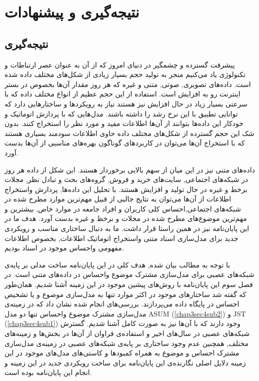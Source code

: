 \chapter{نتیجه‌گیری و پیشنهادات}
\thispagestyle{empty}
\section{نتیجه‌گیری}
پیشرفت گسترده و چشمگیر در دنیای امروز که از آن به عنوان عصر ارتباطات و تکنولوژی یاد می‌کنیم منجر به تولید حجم بسيار زیادی از شکل‌های مختلف داده شده است. داده‌های تصویری, صوتی, متنی و غیره که هر روز مقدار آن‌ها بخصوص در بستر اینترنت رو به افزایش است. استفاده از این حجم عظیم از انواع مختلف داده که با سرعتی بسيار زیاد در حال افزایش نیز هستند نیاز به رویکردها و ساختارهایی دارد که توانایی تطبیق با این نرخ رشد را داشته باشند. مدل‌هایی که با پردازش اتوماتیک و خودکار این داده‌ها بتوانند از آن‌ها اطلاعات مفید و مورد نظر را استخراج کنند. بدون شک این حجم گسترده از شکل‌های مختلف داده حاوی اطلاعات سودمند بسياری هستند که با استخراج آن‌ها می‌توان در کاربردهای گوناگون بهره‌های مناسبی از آن‌ها بدست آورد. 

داده‌های متنی نیز در این میان از سهم بالایی برخوردار هستند. این شکل از داده هر روز در شبکه‌های اجتماعی, سایت‌های خرید و فروش, گروه‌های بحث و تبادل نظر, مجلات برخط و غیره در حال تولید و افزایش هستند. با تحلیل این داده‌ها, پردازش واستخراج اطلاعات از آن‌ها می‌توان به نتایج جالبی از قبیل مهم‌ترین موارد مطرح شده در شبکه‌های اجتماعی,احساس کلی کاربران و افراد جامعه در موارد خاص, بیشترین و مهم‌ترین موضوع‌های مطرح شده در مجلات و برخظ و غیره بدست آورد. هدف ما در این پایان‌‌نامه نیز در همین راستا قرار داشت. ما به دنبال ساختاری مناسب و رویکردی جدید برای مدل‌سازی اسناد متنی واستخراج اتوماتیک اطلاعات, بخصوص اطلاعات مفهومی واحساس موجود در اسناد بودیم.

با توجه به مطالب بیان شده, هدف کلی در این پایان‌‌نامه ساخت مدلی بر پایه‌ی شبکه‌های عصبی برای مدل‌سازی مشترک موضوع واحساس در داده‌های متنی است. در فصل سوم این پایان‌‌نامه با روش‌های پیشین موجود در این زمینه آشنا شدیم. همان‌طور که گفته شد ساختارهای موجود در اکثر موارد تنها به مدل‌سازی موضوع و یا تشخیص احساس در پایگاه داده می‌پردازند. بررسی‌های انجام شده نشان داد که در زمینه‌ی مدل‌سازی مشترک موضوع واحساس تنها دو مدل
ASUM (\ref{chap3sec4sub2})
و 
JST (\ref{chap3sec4sub1})
وجود دارند که با آن‌ها نیز به صورت کامل آشنا شدیم. گسترش شبکه‌های عصبی در سال‌های اخیر و استفاده‌ی فراوان از آن‌ها در بخش‌ها و زمینه‌های مختلف, همچنین عدم وجود ساختاری بر پایه‌ی شبکه‌های عصبی در زمینه‌ی مدل‌سازی مشترک احساس و موضوع به همراه کمبودها و کاستی‌های مدل‌های موجود در این زمینه دلایل اصلی نگارند‌ه‌ی این پایان‌‌نامه برای ساخت رویکردی جدید در این زمینه و انجام این پایان‌‌نامه بوده است.

